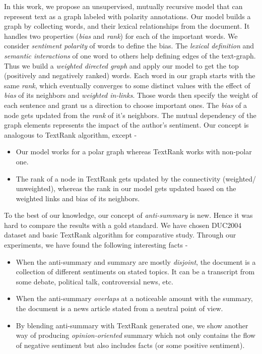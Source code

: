 \documentclass[a4paper]{report}
\begin{document}
\par In this work, we propose an unsupervised, mutually recursive model that can represent text as a graph labeled with polarity annotations.  
Our model builds a graph by collecting words, and their lexical relationships from the document. It handles two properties (\emph{bias} and \emph{rank}) for each of the important words. We consider \emph{sentiment polarity} of words to define the bias. The \emph{lexical definition} and \emph{semantic interactions} of one word to others help defining edges of the text-graph. Thus we build a \emph{weighted directed graph} and apply our model to get the top (positively and negatively ranked) words. Each word in our graph starts with the same \emph{rank}, which eventually converges to some distinct values with the effect of \emph{bias} of its neighbors and \emph{weighted in-links}. Those words then specify the weight of each sentence and grant us a direction to choose important ones. The \emph{bias} of a node gets updated from the \emph{rank} of it's neighbors. The mutual dependency of the graph elements represents the impact of the author's sentiment. Our concept is analogous to {TextRank} algorithm, except -
\begin{small}
\begin{itemize}
\item Our model works for a polar graph whereas TextRank works with non-polar one. 
\item The rank of a node in TextRank gets updated by the connectivity (weighted/ unweighted), whereas the rank in our model gets updated based on the weighted links and bias of its neighbors.
\end{itemize}
\end{small}
\par To the best of our knowledge, our concept of \emph{anti-summary} is new. Hence it was hard to compare the results with a gold standard. We have chosen DUC2004 dataset and basic TextRank algorithm for comparative study. Through our experiments, we have found the following interesting facts -
\begin{small}
\begin{itemize}
\item When the anti-summary and summary are mostly \emph{disjoint}, the document is a collection of different sentiments on stated topics. It can be a transcript from some debate, political talk, controversial news, etc.
\item When the anti-summary \emph{overlaps} at a noticeable amount with the summary, the document is a news article stated from a neutral point of view.
\item By blending anti-summary with TextRank generated one, we show another way of producing \emph{opinion-oriented} summary which not only contains the flow of negative sentiment but also includes facts (or some positive sentiment).
\end{itemize}
\end{small}
\end{document}
